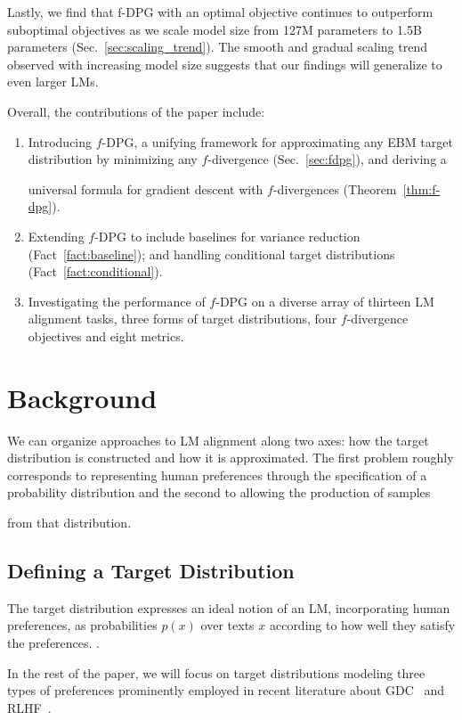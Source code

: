 Lastly, we find that f-DPG with an optimal objective continues to outperform suboptimal objectives as we scale model size from 127M parameters to 1.5B parameters (Sec.~\ref{sec:scaling_trend}). The smooth and gradual scaling trend observed with increasing model size suggests that our findings will generalize to even larger LMs.

Overall, the contributions of the paper include:

\begin{enumerate}
\itemsep0em \item Introducing $f$-DPG, a unifying framework for approximating any EBM target distribution by minimizing any $f$-divergence (Sec.~\ref{sec:fdpg}), and deriving a 

    {universal} formula for gradient descent with $f$-divergences (Theorem~\ref{thm:f-dpg}).
    \item Extending $f$-DPG to include baselines for variance reduction (Fact~\ref{fact:baseline}); and handling conditional target distributions (Fact~\ref{fact:conditional}).
    \item Investigating the performance of $f$-DPG on a {diverse} array of {thirteen LM alignment} tasks, three forms of target distributions, four $f$-divergence objectives and eight metrics.
\end{enumerate}

\section{Background}\label{sec:RM_DM_prelim}

{We can organize} approaches to LM alignment along two axes: how the target distribution is {constructed} and how it is approximated. The first problem roughly corresponds to representing human preferences through the specification of a probability distribution and the second to {allowing the production of samples}

from that distribution. 

\subsection{Defining a Target Distribution}

The target distribution expresses {an ideal notion of an LM, incorporating human preferences, as probabilities $p(x)$ over texts $x$ according to} {how well they satisfy the preferences.} .

In the rest of the paper, we will focus on target distributions modeling {three types of preferences} prominently employed in recent literature {about} GDC~\cite{khalifa2021distributional} and RLHF~\cite{ziegler2019fine,stiennon2020,ouyang2022training,menick_2022_sparrow,bai2022training}.

